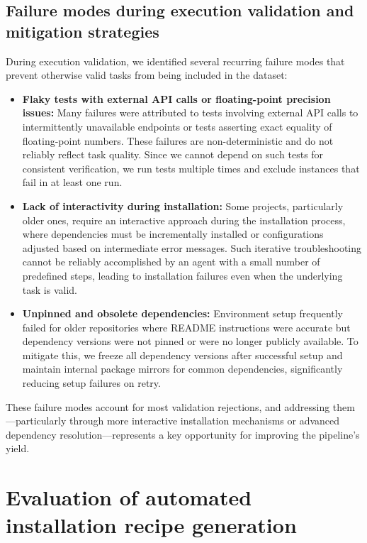 \documentclass[dandb]{article}
\begin{document}
\subsection{Failure modes during execution validation and mitigation strategies}
\label{appendix:failure_modes}

During execution validation, we identified several recurring failure modes that prevent otherwise valid tasks from being included in the dataset:

\begin{itemize}
    \item \textbf{Flaky tests with external API calls or floating-point precision issues:} Many failures were attributed to tests involving external API calls to intermittently unavailable endpoints or tests asserting exact equality of floating-point numbers. These failures are non-deterministic and do not reliably reflect task quality. Since we cannot depend on such tests for consistent verification, we run tests multiple times and exclude instances that fail in at least one run.
    
    \item \textbf{Lack of interactivity during installation:} Some projects, particularly older ones, require an interactive approach during the installation process, where dependencies must be incrementally installed or configurations adjusted based on intermediate error messages. Such iterative troubleshooting cannot be reliably accomplished by an agent with a small number of predefined steps, leading to installation failures even when the underlying task is valid.
    
    \item \textbf{Unpinned and obsolete dependencies:} Environment setup frequently failed for older repositories where README instructions were accurate but dependency versions were not pinned or were no longer publicly available. To mitigate this, we freeze all dependency versions after successful setup and maintain internal package mirrors for common dependencies, significantly reducing setup failures on retry.
\end{itemize}

These failure modes account for most validation rejections, and addressing them---particularly through more interactive installation mechanisms or advanced dependency resolution---represents a key opportunity for improving the pipeline's yield.


\section{Evaluation of automated installation recipe generation}
\label{appendix:install_method_eval}
\end{document}
